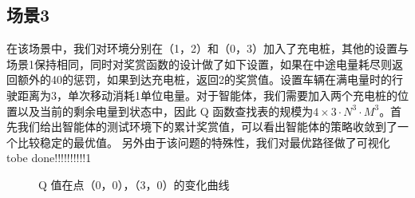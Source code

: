 \documentclass{standalone}
\begin{document}
\subsection{场景3}
在该场景中，我们对环境分别在（1，2）和（0，3）加入了充电桩，其他的设置与场景1保持相同，同时对奖赏函数的设计做了如下设置，如果在中途电量耗尽则返回额外的40的惩罚，如果到达充电桩，返回2的奖赏值。设置车辆在满电量时的行驶距离为3，单次移动消耗1单位电量。对于智能体，我们需要加入两个充电桩的位置以及当前的剩余电量到状态中，因此 Q 函数查找表的规模为$4\times 3 \cdot N^3 \cdot M^3$。首先我们给出智能体的测试环境下的累计奖赏值，可以看出智能体的策略收敛到了一个比较稳定的最优值。
另外由于该问题的特殊性，我们对最优路径做了可视化 tobe done!!!!!!!!!!1


\begin{figure}[h]
	\caption{Q 值在点（0，0），（3，0）的变化曲线}
	\label{fig1}
\end{figure}
\end{document}
